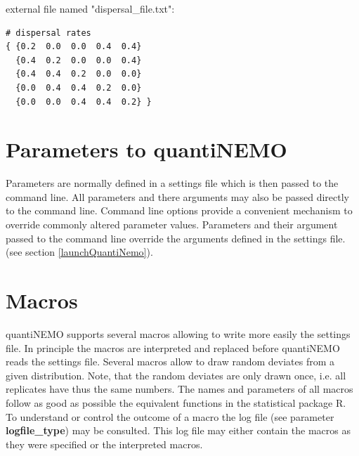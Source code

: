 \documentclass[letterpaper,12pt,oneside]{book}
\begin{document}
external file named "dispersal\_file.txt":
\begin{lstlisting}[frame=single]
# dispersal rates
{ {0.2  0.0  0.0  0.4  0.4}
  {0.4  0.2  0.0  0.0  0.4}
  {0.4  0.4  0.2  0.0  0.0}
  {0.0  0.4  0.4  0.2  0.0}
  {0.0  0.0  0.4  0.4  0.2} }
\end{lstlisting}

\section{Parameters to quantiNEMO}\label{paramInput}
Parameters are normally defined in a settings file which is then passed to the command line. All parameters and there arguments may also be passed directly to the command line. Command line options provide a convenient mechanism to override commonly altered parameter values. Parameters and their argument passed to the command line override the arguments defined in the settings file. (see section \ref{launchQuantiNemo}). 

\section{Macros}\label{macros}
quantiNEMO supports several macros allowing to write more easily the settings file. In principle the macros are interpreted and replaced before quantiNEMO reads the settings file. Several macros allow to draw random deviates from a given distribution. Note, that the random deviates are only drawn once, i.e. all replicates have thus the same numbers. The names and parameters of all macros follow as good as possible the equivalent functions in the statistical package R. To understand or control the outcome of a macro the log file (see parameter \textbf{logfile\_type}) may be consulted. This log file may either contain the macros as they were specified or the interpreted macros.
\end{document}
